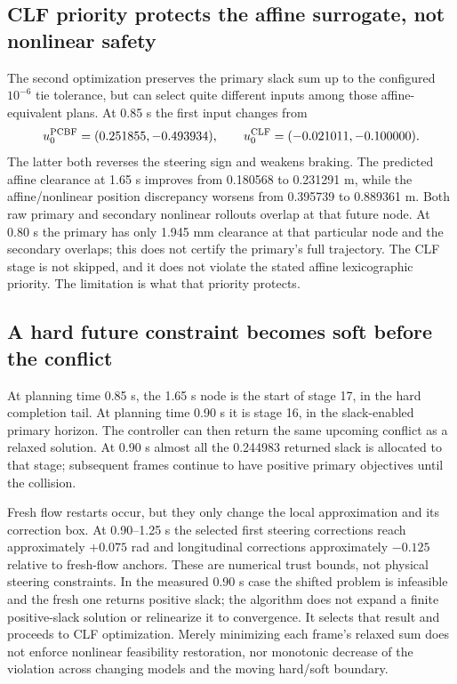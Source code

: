 \documentclass[11pt]{article}
\begin{document}
\subsection{CLF priority protects the affine surrogate, not nonlinear safety}
The second optimization preserves the primary slack sum up to the configured
$10^{-6}$ tie tolerance, but can select quite different inputs among those
affine-equivalent plans. At 0.85 s the first input changes from
\[
 u_0^{\rm PCBF}=(0.251855,-0.493934),\qquad
 u_0^{\rm CLF}=(-0.021011,-0.100000).
\]
The latter both reverses the steering sign and weakens braking. The predicted
affine clearance at 1.65 s improves from 0.180568 to 0.231291 m, while the
affine/nonlinear position discrepancy worsens from 0.395739 to 0.889361 m.
Both raw primary and secondary nonlinear rollouts overlap at that future
node. At 0.80 s the primary has only 1.945 mm clearance at that particular
node and the secondary overlaps; this does not certify the primary's full
trajectory. The CLF stage is not skipped, and it does not violate the stated
affine lexicographic priority. The limitation is what that priority protects.

\subsection{A hard future constraint becomes soft before the conflict}
At planning time 0.85 s, the 1.65 s node is the start of stage 17, in the hard
completion tail. At planning time 0.90 s it is stage 16, in the slack-enabled
primary horizon. The controller can then return the same upcoming conflict
as a relaxed solution. At 0.90 s almost all the 0.244983 returned slack is
allocated to that stage; subsequent frames continue to have positive primary
objectives until the collision.

Fresh flow restarts occur, but they only change the local approximation and
its correction box. At 0.90--1.25 s the selected first steering corrections
reach approximately $+0.075$ rad and longitudinal corrections approximately
$-0.125$ relative to fresh-flow anchors. These are numerical trust bounds,
not physical steering constraints. In the measured 0.90 s case the shifted
problem is infeasible and the fresh one returns positive slack; the algorithm
does not expand a finite positive-slack solution or relinearize it to
convergence. It selects that result and proceeds to CLF optimization.
Merely minimizing each frame's relaxed sum does not enforce nonlinear
feasibility restoration, nor monotonic decrease of the violation across
changing models and the moving hard/soft boundary.
\end{document}
